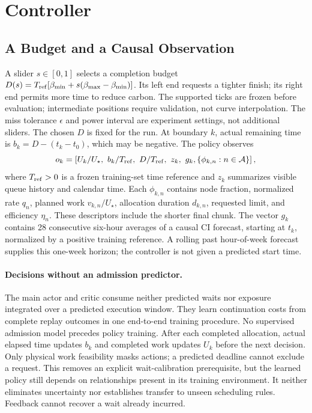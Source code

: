 \section{\name{} Controller}
\label{sec:method}

\subsection{A Budget and a Causal Observation}
A slider $s\in[0,1]$ selects a completion budget
$D(s)=T_{\rm ref}[\beta_{\min}+s(\beta_{\max}-\beta_{\min})]$.
Its left end requests a tighter finish; its right end permits more time to
reduce carbon. The supported ticks are frozen before evaluation; intermediate
positions require validation, not curve interpolation. The miss tolerance
$\epsilon$ and power interval are experiment settings, not additional sliders.
The chosen $D$ is fixed for the run. At boundary $k$, actual remaining time is
$b_k=D-(t_k-t_0)$, which may be negative. The policy observes
\begin{equation}
 o_k=\left[U_k/U_\star,\ b_k/T_{\rm ref},\ D/T_{\rm ref},\ z_k,\
                    g_k,\{\phi_{k,n}:n\in\mathcal A\}\right],
 \label{eq:state}
\end{equation}
where $T_{\rm ref}>0$ is a frozen training-set time reference and $z_k$
summarizes visible queue history and calendar time. Each $\phi_{k,n}$ contains
node fraction, normalized rate $q_n$, planned work $v_{k,n}/U_\star$, allocation
duration $d_{k,n}$, requested limit, and efficiency $\eta_n$. These descriptors
include the shorter final chunk. The vector $g_k$ contains 28 consecutive
six-hour averages of a causal CI forecast, starting at $t_k$, normalized by a
positive training reference. A rolling past hour-of-week forecast supplies
this one-week horizon; the controller is not given a predicted start time.

\paragraph{Decisions without an admission predictor.}
The main actor and critic consume neither predicted waits nor exposure
integrated over a predicted execution window. They learn continuation costs
from complete replay outcomes in one end-to-end training procedure. No
supervised admission model precedes policy training. After each completed allocation, actual elapsed
time updates $b_k$ and completed work updates $U_k$ before the next decision.
Only physical work feasibility masks actions; a predicted deadline cannot
exclude a request. This removes an explicit wait-calibration prerequisite,
but the learned policy still depends on relationships present in its training
environment. It neither eliminates uncertainty nor establishes transfer to
unseen scheduling rules. Feedback cannot recover a wait already incurred.

